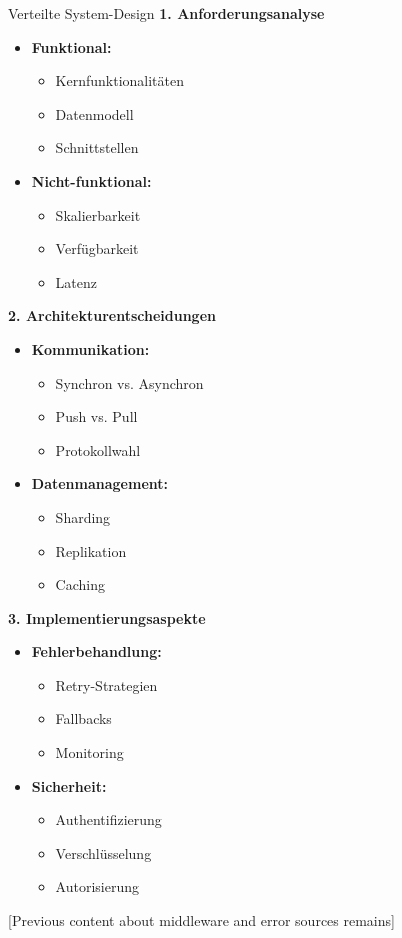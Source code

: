 \begin{KR}{Verteilte System-Design}
\textbf{1. Anforderungsanalyse}
\begin{itemize}
    \item \textbf{Funktional:}
    \begin{itemize}
        \item Kernfunktionalitäten
        \item Datenmodell
        \item Schnittstellen
    \end{itemize}
    \item \textbf{Nicht-funktional:}
    \begin{itemize}
        \item Skalierbarkeit
        \item Verfügbarkeit
        \item Latenz
    \end{itemize}
\end{itemize}

\textbf{2. Architekturentscheidungen}
\begin{itemize}
    \item \textbf{Kommunikation:}
    \begin{itemize}
        \item Synchron vs. Asynchron
        \item Push vs. Pull
        \item Protokollwahl
    \end{itemize}
    \item \textbf{Datenmanagement:}
    \begin{itemize}
        \item Sharding
        \item Replikation
        \item Caching
    \end{itemize}
\end{itemize}

\textbf{3. Implementierungsaspekte}
\begin{itemize}
    \item \textbf{Fehlerbehandlung:}
    \begin{itemize}
        \item Retry-Strategien
        \item Fallbacks
        \item Monitoring
    \end{itemize}
    \item \textbf{Sicherheit:}
    \begin{itemize}
        \item Authentifizierung
        \item Verschlüsselung
        \item Autorisierung
    \end{itemize}
\end{itemize}
\end{KR}

[Previous content about middleware and error sources remains]